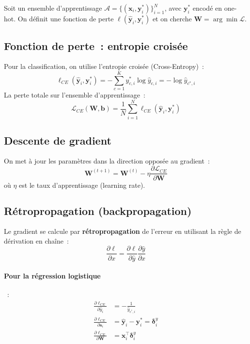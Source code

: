 \documentclass[a4paper,11pt]{article}
\theoremstyle{definition}
\theoremstyle{remark}
\begin{document}
Soit un ensemble d'apprentissage $\mathcal{A} =
\{(\mathbf{x}_i, \mathbf{y}_i^*)\}_{i=1}^N$, avec
$\mathbf{y}_i^*$ encod\'e en one-hot. On d\'efinit une fonction
de perte $\ell(\hat{\mathbf{y}}_i, \mathbf{y}_i^*)$ et on
cherche $\mathbf{W} = \arg\min \mathcal{L}$.

\subsection{Fonction de perte~: entropie crois\'ee}

Pour la classification, on utilise l'entropie crois\'ee
(Cross-Entropy)~:
\begin{equation}
  \ell_{CE}(\hat{\mathbf{y}}_i, \mathbf{y}_i^*) =
  -\sum_{c=1}^K y_{c,i}^* \log \hat{y}_{c,i} =
  -\log \hat{y}_{c^*, i}
\end{equation}
La perte totale sur l'ensemble d'apprentissage~:
\begin{equation}
  \mathcal{L}_{CE}(\mathbf{W}, \mathbf{b}) =
  \frac{1}{N} \sum_{i=1}^N \ell_{CE}(\hat{\mathbf{y}}_i,
  \mathbf{y}_i^*)
\end{equation}

\subsection{Descente de gradient}

On met \`a jour les param\`etres dans la direction oppos\'ee au
gradient~:
\begin{equation}
  \mathbf{W}^{(t+1)} = \mathbf{W}^{(t)} -
  \eta \frac{\partial \mathcal{L}_{CE}}{\partial \mathbf{W}}
\end{equation}
o\`u $\eta$ est le taux d'apprentissage (learning rate).

\subsection{R\'etropropagation (backpropagation)}

Le gradient se calcule par \textbf{r\'etropropagation} de l'erreur
en utilisant la r\`egle de d\'erivation en cha\^ine~:
\begin{equation}
  \frac{\partial \ell}{\partial x} =
  \frac{\partial \ell}{\partial \hat{y}}
  \frac{\partial \hat{y}}{\partial x}
\end{equation}

\paragraph{Pour la r\'egression logistique}~:
\begin{align}
  \frac{\partial \ell_{CE}}{\partial \hat{y}_i} &=
  -\frac{1}{\hat{y}_{c^*, i}} \\
  \frac{\partial \ell_{CE}}{\partial \mathbf{s}_i} &= \hat{\mathbf{y}}_i -
  \mathbf{y}_i^* = \boldsymbol\delta_i^y \\
  \frac{\partial \ell_{CE}}{\partial \mathbf{W}} &=
  \mathbf{x}_i^\intercal \boldsymbol\delta_i^y
\end{align}
\end{document}
